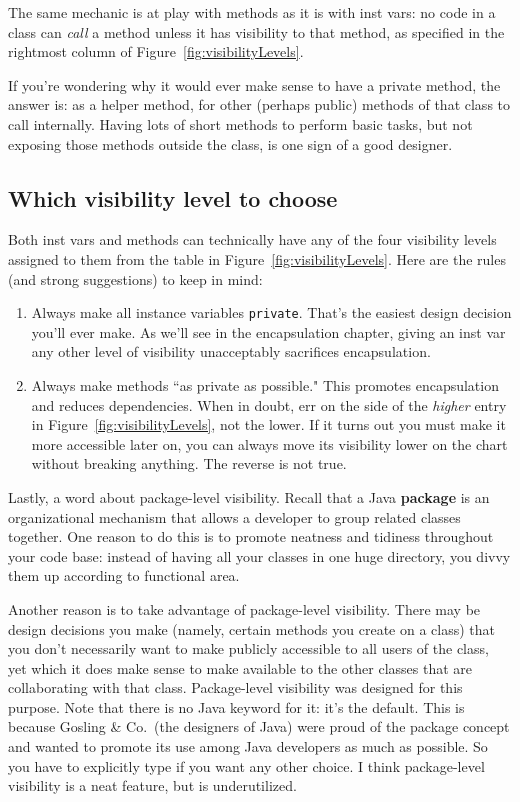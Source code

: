 The same mechanic is at play with methods as it is with inst vars: no code in
a class can \textit{call} a method unless it has visibility to that method,
as specified in the rightmost column of Figure~\ref{fig:visibilityLevels}.

If you're wondering why it would ever make sense to have a private method, the
answer is: as a helper method, for other (perhaps public) methods of that
class to call internally. Having lots of short methods to perform basic tasks,
but not exposing those methods outside the class, is one sign of a good
designer.

\subsection{Which visibility level to choose}

Both inst vars and methods can technically have any of the four visibility
levels assigned to them from the table in Figure~\ref{fig:visibilityLevels}.
Here are the rules (and strong suggestions) to keep in mind:

\begin{enumerate}
\itemsep.1em
\item Always make all instance variables \texttt{private}. That's the easiest
design decision you'll ever make. As we'll see in the encapsulation chapter,
giving an inst var any other level of visibility unacceptably sacrifices
encapsulation.
\item Always make methods ``as private as possible." This promotes
encapsulation and reduces dependencies. When in doubt, err on the side of the
\textit{higher} entry in Figure~\ref{fig:visibilityLevels}, not the lower. If
it turns out you must make it more accessible later on, you can always move
its visibility lower on the chart without breaking anything. The reverse is
not true.
\end{enumerate}

Lastly, a word about package-level visibility. Recall that a Java
\textbf{package} is an organizational mechanism that allows a developer to
group related classes together. One reason to do this is to promote neatness
and tidiness throughout your code base: instead of having all your classes in
one huge directory, you divvy them up according to functional area. 

Another reason is to take advantage of package-level visibility. There may be
design decisions you make (namely, certain methods you create on a class) that
you don't necessarily want to make publicly accessible to all users of the
class, yet which it does make sense to make available to the other classes
that are collaborating with that class. Package-level visibility was designed
for this purpose. Note that there is no Java keyword for it: it's the default.
This is because Gosling \& Co.~(the designers of Java) were proud of the
package concept and wanted to promote its use among Java developers as much as
possible. So you have to explicitly type if you want any other choice. I think
package-level visibility is a neat feature, but is underutilized.

